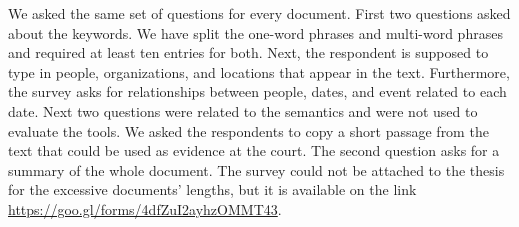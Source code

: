 \documentclass[
  digital, %
  notable,   %
  nolof,     %
  nolot,     %
]{fithesis3}
\begin{document}
We asked the same set of questions for every document.
First two questions asked about the keywords.
We have split the one-word phrases and multi-word phrases and required at least ten entries for both.
Next, the respondent is supposed to type in people, organizations, and locations that appear in the text.
Furthermore, the survey asks for relationships between people, dates, and event related to each date.
Next two questions were related to the semantics and were not used to evaluate the tools.
We asked the respondents to copy a short passage from the text that could be used as evidence at the court.
The second question asks for a summary of the whole document.
The survey could not be attached to the thesis for the excessive documents' lengths, but it is available on the link \url{https://goo.gl/forms/4dfZuI2ayhzOMMT43}.
\end{document}
